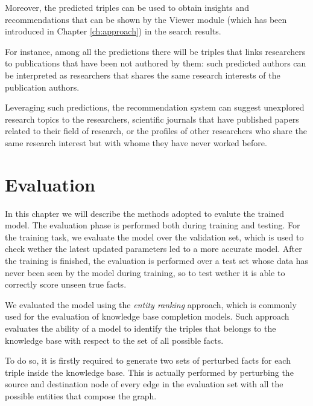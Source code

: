 \documentclass[%
    corpo=13.5pt,
    twoside,
    oldstyle,
    tipotesi=magistrale,
    greek,
    evenboxes
]{toptesi}
\begin{document}
Moreover, the predicted triples can be used to obtain insights and
recommendations that can be shown by the Viewer module (which has been
introduced in Chapter \ref{ch:approach}) in the search results.

For instance, among all the predictions there will be triples that links
researchers to publications that have been not authored by them: such
predicted authors can be interpreted as researchers that
shares the same research interests of the publication authors.

Leveraging such predictions, the recommendation system can suggest
unexplored research topics to the researchers, scientific journals that
have published papers related to their field of research, or
the profiles of other researchers who share the same research interest but
with whome they have never worked before.



\chapter{Evaluation}

In this chapter we will describe the methods adopted to evalute the trained
model.
The evaluation phase is performed both during training and testing. For the training
task, we evaluate the model over the validation set, which is used to check
wether the latest updated parameters led to a more accurate model.
After the training is finished, the evaluation is performed over a test set
whose data has never been seen by the model during training, so to test
wether it is able to correctly score unseen true facts.

We evaluated the model using the \emph{entity ranking} approach, which is
commonly used for the evaluation of knowledge base completion models.
Such approach evaluates the ability of a model to identify the triples that
belongs to the knowledge base with respect to the set of all possible facts.

To do so, it is firstly required to generate two sets of perturbed facts for
each triple inside the knowledge base.
This is actually performed by perturbing the source and destination
node of every edge in the evaluation set with all the possible entities
that compose the graph.
\end{document}

